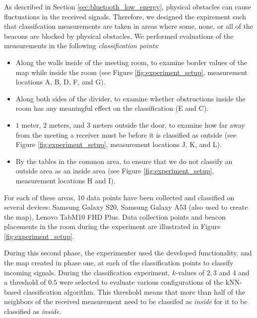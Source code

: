 As described in Section \ref{sec:bluetooth_low_energy}, physical obstacles can cause fluctuations in the received signals. 
Therefore, we designed the expirement such that classifcation measurements are taken in areas where some, none, or all of the beacons are blocked by physical obstacles. 
We performed evaluations of the measurements in the following \textit{classification points}:
\begin{itemize}
    \item Along the walls inside of the meeting room, to examine border values of the map while inside the room (see Figure \ref{fig:experiment_setup}, measurement locations A, B, D, F, and G).
    \item Along both sides of the divider, to examine whether obstructions inside the room has any meaningful effect on the classification (E and C).
    \item $1$ meter, $2$ meters, and $3$ meters outside the door, to examine how far away from the meeting a receiver must be before it is classified as outside (see Figure \ref{fig:experiment_setup}, measurement locations J, K, and L).
    \item By the tables in the common area, to ensure that we do not classify an outside area as an inside area (see Figure \ref{fig:experiment_setup}, measurement locations H and I).
\end{itemize}
For each of these areas, 10 data points have been collected and classified on several devices: Samsung Galaxy S20, Samsung Galaxy A53 (also used to create the map), Lenovo TabM10 FHD Plus.
Data collection points and beacon placements in the room during the experiment are illustrated in Figure \ref{fig:experiment_setup}. 

During this second phase, the experimenter used the developed functionality, and the map created in phase one, at each of the classification points to classify incoming signals.
During the classification experiment, $k$-values of $2,3$ and $4$ and a threshold of $0.5$ were selected to evaluate various configurations of the kNN-based classification algorithm.
This threshold means that more than half of the neighbors of the received measurement need to be classifed as \textit{inside} for it to be classified as \textit{inside}.

